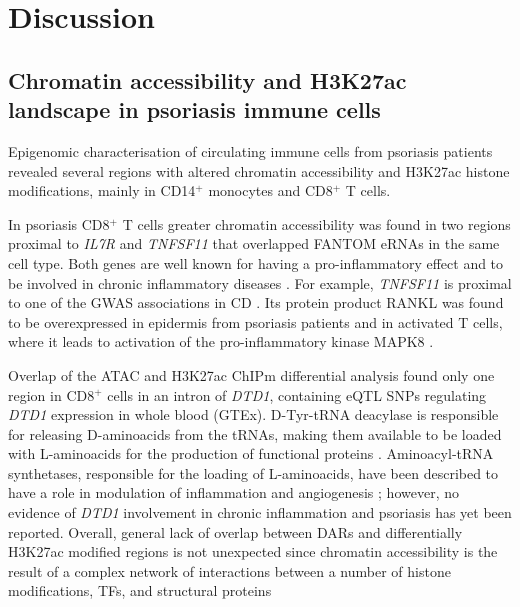 \section{Discussion}

\subsection{Chromatin accessibility and H3K27ac landscape in psoriasis immune cells}

Epigenomic characterisation of circulating immune cells from psoriasis patients revealed several regions with altered chromatin accessibility and H3K27ac histone modifications, mainly in CD14$^+$ monocytes and CD8$^+$ T cells.


In psoriasis CD8$^+$ T cells greater chromatin accessibility was found in two regions proximal to \textit{IL7R} and \textit{TNFSF11} that overlapped FANTOM eRNAs in the same cell type. Both genes are well known for having a pro-inflammatory effect and to be involved in chronic inflammatory diseases \parencite{Gregory2007,Cortes2011}. For example, \textit{TNFSF11} is proximal to one of the GWAS associations in CD  \parencite{Franke2010}. Its protein product RANKL was found to be overexpressed in epidermis from psoriasis patients and in activated T cells, where it leads to activation of the pro-inflammatory kinase MAPK8 \parencite{Toberer2011,Wong1997}. 

Overlap of the ATAC and H3K27ac ChIPm differential analysis found only one region in CD8$^+$ cells in an intron of \textit{DTD1}, containing eQTL SNPs regulating \textit{DTD1} expression in whole blood (GTEx). D-Tyr-tRNA deacylase is responsible for releasing D-aminoacids from the tRNAs, making them available to be loaded with L-aminoacids for the production of functional proteins \parencite{Bhatt2016}. Aminoacyl‐tRNA synthetases, responsible for the loading of L-aminoacids, have been described to have a role in modulation of inflammation and angiogenesis \parencite{Yao2013}; however, no evidence of \textit{DTD1} involvement in chronic inflammation and psoriasis has yet been reported. Overall, general lack of overlap between DARs and differentially H3K27ac modified regions is not unexpected since chromatin accessibility is the result of a complex network of interactions between a number of histone modifications, TFs, and structural proteins


